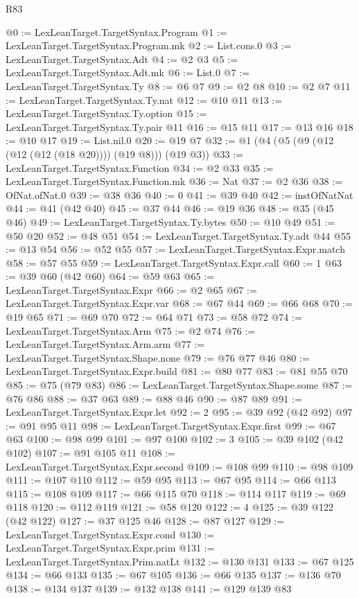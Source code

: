 \begin{lexlean}{R83}
\begin{coremodule}
@0 := LexLeanTarget.TargetSyntax.Program
@1 := LexLeanTarget.TargetSyntax.Program.mk
@2 := List.cons.{0}
@3 := LexLeanTarget.TargetSyntax.Adt
@4 := @2 @3
@5 := LexLeanTarget.TargetSyntax.Adt.mk
@6 := List.{0}
@7 := LexLeanTarget.TargetSyntax.Ty
@8 := @6 @7
@9 := @2 @8
@10 := @2 @7
@11 := LexLeanTarget.TargetSyntax.Ty.nat
@12 := @10 @11
@13 := LexLeanTarget.TargetSyntax.Ty.option
@15 := LexLeanTarget.TargetSyntax.Ty.pair @11
@16 := @15 @11
@17 := @13 @16
@18 := @10 @17
@19 := List.nil.{0}
@20 := @19 @7
@32 := @1 (@4 (@5 (@9 (@12 (@12 (@12 (@18 @20)))) (@19 @8))) (@19 @3))
@33 := LexLeanTarget.TargetSyntax.Function
@34 := @2 @33
@35 := LexLeanTarget.TargetSyntax.Function.mk
@36 := Nat
@37 := @2 @36
@38 := OfNat.ofNat.{0}
@39 := @38 @36
@40 := 0
@41 := @39 @40
@42 := instOfNatNat
@44 := @41 (@42 @40)
@45 := @37 @44
@46 := @19 @36
@48 := @35 (@45 @46)
@49 := LexLeanTarget.TargetSyntax.Ty.bytes
@50 := @10 @49
@51 := @50 @20
@52 := @48 @51
@54 := LexLeanTarget.TargetSyntax.Ty.adt @44
@55 := @13 @54
@56 := @52 @55
@57 := LexLeanTarget.TargetSyntax.Expr.match
@58 := @57 @55
@59 := LexLeanTarget.TargetSyntax.Expr.call
@60 := 1
@63 := @39 @60 (@42 @60)
@64 := @59 @63
@65 := LexLeanTarget.TargetSyntax.Expr
@66 := @2 @65
@67 := LexLeanTarget.TargetSyntax.Expr.var
@68 := @67 @44
@69 := @66 @68
@70 := @19 @65
@71 := @69 @70
@72 := @64 @71
@73 := @58 @72
@74 := LexLeanTarget.TargetSyntax.Arm
@75 := @2 @74
@76 := LexLeanTarget.TargetSyntax.Arm.arm
@77 := LexLeanTarget.TargetSyntax.Shape.none
@79 := @76 @77 @46
@80 := LexLeanTarget.TargetSyntax.Expr.build
@81 := @80 @77
@83 := @81 @55 @70
@85 := @75 (@79 @83)
@86 := LexLeanTarget.TargetSyntax.Shape.some
@87 := @76 @86
@88 := @37 @63
@89 := @88 @46
@90 := @87 @89
@91 := LexLeanTarget.TargetSyntax.Expr.let
@92 := 2
@95 := @39 @92 (@42 @92)
@97 := @91 @95 @11
@98 := LexLeanTarget.TargetSyntax.Expr.first
@99 := @67 @63
@100 := @98 @99
@101 := @97 @100
@102 := 3
@105 := @39 @102 (@42 @102)
@107 := @91 @105 @11
@108 := LexLeanTarget.TargetSyntax.Expr.second
@109 := @108 @99
@110 := @98 @109
@111 := @107 @110
@112 := @59 @95
@113 := @67 @95
@114 := @66 @113
@115 := @108 @109
@117 := @66 @115 @70
@118 := @114 @117
@119 := @69 @118
@120 := @112 @119
@121 := @58 @120
@122 := 4
@125 := @39 @122 (@42 @122)
@127 := @37 @125 @46
@128 := @87 @127
@129 := LexLeanTarget.TargetSyntax.Expr.cond
@130 := LexLeanTarget.TargetSyntax.Expr.prim
@131 := LexLeanTarget.TargetSyntax.Prim.natLt
@132 := @130 @131
@133 := @67 @125
@134 := @66 @133
@135 := @67 @105
@136 := @66 @135
@137 := @136 @70
@138 := @134 @137
@139 := @132 @138
@141 := @129 @139 @83

\end{coremodule}
\end{lexlean}
